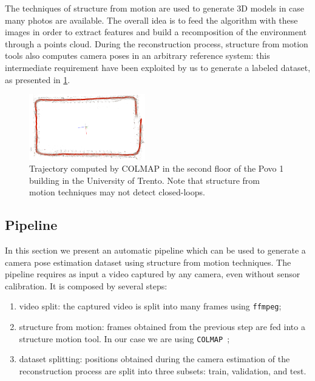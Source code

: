 The techniques of structure from motion are used to generate 3D models in case many photos are available. The overall idea is to feed the algorithm with these images in order to extract features and build a recomposition of the environment through a points cloud.
During the reconstruction process, structure from motion tools also computes camera poses in an arbitrary reference system: this intermediate requirement have been exploited by us to generate a labeled dataset, as presented in \cref{fig:trajectory-colmap}.

\begin{figure}[htbp]
    \begin{center}
        \includegraphics[width=0.45\textwidth]{./imgs/trajectory_colmap.png}
    \end{center}
    \caption{Trajectory computed by COLMAP in the second floor of the Povo 1 building in the University of Trento. Note that structure from motion techniques may not detect closed-loops.}
    \label{fig:trajectory-colmap}
\end{figure}

\subsection{Pipeline}
In this section we present an automatic pipeline which can be used to generate a camera pose estimation dataset using structure from motion techniques. The pipeline requires as input a video captured by any camera, even without sensor calibration. It is composed by several steps:
\begin{enumerate}
    \item video split: the captured video is split into many frames using \texttt{ffmpeg};
    \item structure from motion: frames obtained from the previous step are fed into a structure motion tool. In our case we are using \texttt{COLMAP}~\cite{colmap};
    \item dataset splitting: positions obtained during the camera estimation of the reconstruction process are split into three subsets: train, validation, and test.
\end{enumerate}

